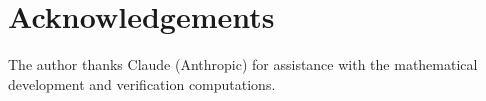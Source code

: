 \documentclass[12pt, a4paper]{article}
\theoremstyle{definition}
\theoremstyle{remark}
\begin{document}
\section*{Acknowledgements}

The author thanks Claude (Anthropic) for assistance with the mathematical development and verification computations.




\end{document}
